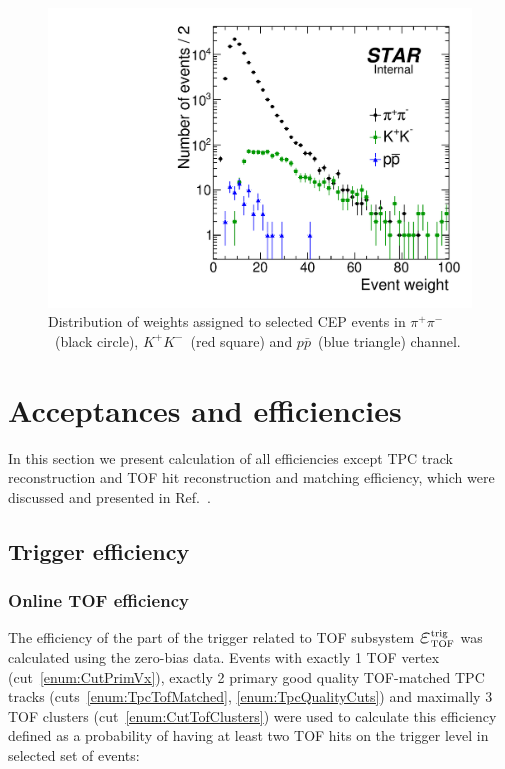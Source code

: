 \begin{figure}[h!]
\centering%
\parbox{0.4725\textwidth}{%
  \centering%
  \includegraphics[width=\linewidth]{graphics/corrections/Weights.pdf}
}%
\quad%
\parbox{0.4725\textwidth}{%
    \caption[Distribution of weights assigned to selected CEP events.]{Distribution of weights assigned to selected CEP events in $\pi^{+}\pi^{-}$~(black circle), $K^{+}K^{-}$~(red square) and $p\bar{p}$~(blue triangle) channel.}\label{fig:weigths}%
}
\end{figure}



\newpage
\section{Acceptances and efficiencies}\label{sec:acceptanceAndEff}

In this section we present calculation of all efficiencies except TPC track reconstruction and TOF hit reconstruction and matching efficiency, which were discussed and presented in Ref.~\cite{supplementaryNote}.

\subsection{Trigger efficiency}\label{sec:triggerEff} 


\subsubsection{Online TOF efficiency}\label{sec:tofOnlineEff}
The efficiency of the part of the trigger related to TOF subsystem $\mbox{\LARGE$\varepsilon$}_{\text{TOF}}^{\text{trig}}$ was calculated using the zero-bias data. Events with exactly 1 TOF vertex (cut~\ref{enum:CutPrimVx}), exactly 2 primary good quality TOF-matched TPC tracks (cuts~\ref{enum:TpcTofMatched}, \ref{enum:TpcQualityCuts}) and maximally 3 TOF clusters (cut~\ref{enum:CutTofClusters}) were used to calculate this efficiency defined as a probability of having at least two TOF hits on the trigger level in selected set of events:

